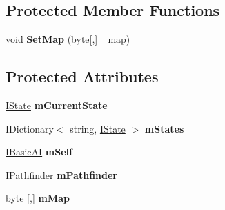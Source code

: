 \subsection*{Protected Member Functions}
\begin{DoxyCompactItemize}
\item 
\mbox{\label{class_g_m_t_b_1_1_entities_1_1_a_i_1_1_a_i_mind_ac21e84ca5a67105beada965885cddb7f}} 
void {\bfseries Set\+Map} (byte\mbox{[},\mbox{]} \+\_\+map)
\end{DoxyCompactItemize}
\subsection*{Protected Attributes}
\begin{DoxyCompactItemize}
\item 
\mbox{\label{class_g_m_t_b_1_1_entities_1_1_a_i_1_1_a_i_mind_adfebfad8695b32ae9f029f9e81c590eb}} 
\mbox{\hyperlink{interface_g_m_t_b_1_1_interfaces_1_1_i_state}{I\+State}} {\bfseries m\+Current\+State}
\item 
\mbox{\label{class_g_m_t_b_1_1_entities_1_1_a_i_1_1_a_i_mind_a64f512dc83eef101488c0b18e7628164}} 
I\+Dictionary$<$ string, \mbox{\hyperlink{interface_g_m_t_b_1_1_interfaces_1_1_i_state}{I\+State}} $>$ {\bfseries m\+States}
\item 
\mbox{\label{class_g_m_t_b_1_1_entities_1_1_a_i_1_1_a_i_mind_a57824cef91ad23b12b6045d9f01bf4dc}} 
\mbox{\hyperlink{interface_g_m_t_b_1_1_interfaces_1_1_i_basic_a_i}{I\+Basic\+AI}} {\bfseries m\+Self}
\item 
\mbox{\label{class_g_m_t_b_1_1_entities_1_1_a_i_1_1_a_i_mind_a54a9510e71f7e53122aab9e79d2cae14}} 
\mbox{\hyperlink{interface_g_m_t_b_1_1_interfaces_1_1_i_pathfinder}{I\+Pathfinder}} {\bfseries m\+Pathfinder}
\item 
byte \mbox{[},\mbox{]} {\bfseries m\+Map}
\end{DoxyCompactItemize}
